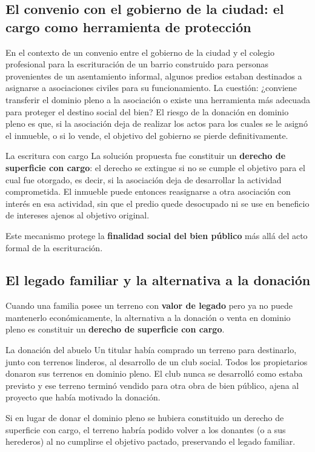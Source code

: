 \documentclass[12pt,oneside]{book}
\begin{document}
\subsection{El convenio con el gobierno de la ciudad: el cargo como herramienta de protección}

En el contexto de un convenio entre el gobierno de la ciudad y el colegio profesional para la escrituración de un barrio construido para personas provenientes de un asentamiento informal, algunos predios estaban destinados a asignarse a asociaciones civiles para su funcionamiento. La cuestión: ¿conviene transferir el dominio pleno a la asociación o existe una herramienta más adecuada para proteger el destino social del bien? El riesgo de la donación en dominio pleno es que, si la asociación deja de realizar los actos para los cuales se le asignó el inmueble, o si lo vende, el objetivo del gobierno se pierde definitivamente.

\begin{example}{La escritura con cargo}
La solución propuesta fue constituir un \textbf{derecho de superficie con cargo}: el derecho se extingue si no se cumple el objetivo para el cual fue otorgado, es decir, si la asociación deja de desarrollar la actividad comprometida. El inmueble puede entonces reasignarse a otra asociación con interés en esa actividad, sin que el predio quede desocupado ni se use en beneficio de intereses ajenos al objetivo original.
\end{example}

Este mecanismo protege la \textbf{finalidad social del bien público} más allá del acto formal de la escrituración.

\subsection{El legado familiar y la alternativa a la donación}

Cuando una familia posee un terreno con \textbf{valor de legado} pero ya no puede mantenerlo económicamente, la alternativa a la donación o venta en dominio pleno es constituir un \textbf{derecho de superficie con cargo}.

\begin{example}{La donación del abuelo}
Un titular había comprado un terreno para destinarlo, junto con terrenos linderos, al desarrollo de un club social. Todos los propietarios donaron sus terrenos en dominio pleno. El club nunca se desarrolló como estaba previsto y ese terreno terminó vendido para otra obra de bien público, ajena al proyecto que había motivado la donación.

Si en lugar de donar el dominio pleno se hubiera constituido un derecho de superficie con cargo, el terreno habría podido volver a los donantes (o a sus herederos) al no cumplirse el objetivo pactado, preservando el legado familiar.
\end{example}
\end{document}
